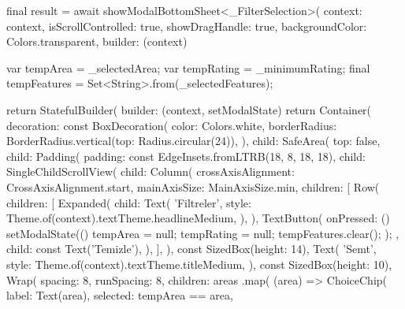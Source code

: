 \documentclass[11pt,a4paper]{article}
\begin{document}
\begin{codeblock}
{{    final result = await showModalBottomSheet<_FilterSelection>(
      context: context,
      isScrollControlled: true,
      showDragHandle: true,
      backgroundColor: Colors.transparent,
      builder: (context) {
        var tempArea = _selectedArea;
        var tempRating = _minimumRating;
        final tempFeatures = Set<String>.from(_selectedFeatures);

        return StatefulBuilder(
          builder: (context, setModalState) {
            return Container(
              decoration: const BoxDecoration(
                color: Colors.white,
                borderRadius: BorderRadius.vertical(top: Radius.circular(24)),
              ),
              child: SafeArea(
                top: false,
                child: Padding(
                  padding: const EdgeInsets.fromLTRB(18, 8, 18, 18),
                  child: SingleChildScrollView(
                    child: Column(
                      crossAxisAlignment: CrossAxisAlignment.start,
                      mainAxisSize: MainAxisSize.min,
                      children: [
                        Row(
                          children: [
                            Expanded(
                              child: Text(
                                'Filtreler',
                                style:
                                    Theme.of(context).textTheme.headlineMedium,
                              ),
                            ),
                            TextButton(
                              onPressed: () {
                                setModalState(() {
                                  tempArea = null;
                                  tempRating = null;
                                  tempFeatures.clear();
                                });
                              },
                              child: const Text('Temizle'),
                            ),
                          ],
                        ),
                        const SizedBox(height: 14),
                        Text(
                          'Semt',
                          style: Theme.of(context).textTheme.titleMedium,
                        ),
                        const SizedBox(height: 10),
                        Wrap(
                          spacing: 8,
                          runSpacing: 8,
                          children: areas
                              .map(
                                (area) => ChoiceChip(
                                  label: Text(area),
                                  selected: tempArea == area,
}}}}
\end{codeblock}
\end{document}
